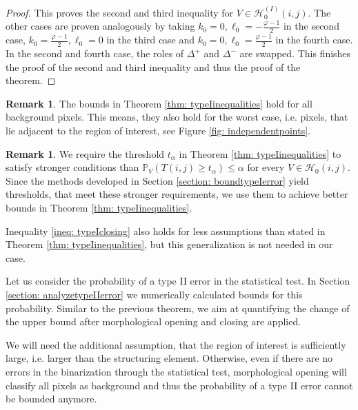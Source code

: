 \documentclass[a4paper,12pt]{article}
\theoremstyle{plain}
\theoremstyle{definition}
\newtheorem{remark}[theorem]{Remark}
\numberwithin{equation}{section}
\begin{document}
\begin{proof}
	This proves the second and third inequality for $V \in \mathcal{H}_0^{(I)}(i, j)$. The other cases are proven analogously by taking $k_0 = 0, \ell_0 = -\frac{\varphi - 1}{2}$ in the second case, $k_0 = \frac{\varphi - 1}{2}, \ell_0 = 0$ in the third case and $k_0 = 0, \ell_0 = \frac{\varphi - 1}{2}$ in the fourth case. In the second and fourth case, the roles of $\Delta^+$ and $\Delta^-$ are swapped. This finishes the proof of the second and third inequality and thus the proof of the theorem.
\end{proof}

\begin{remark}
	The bounds in Theorem \ref{thm: typeIinequalities} hold for all background pixels. This means, they also hold for the worst case, i.e. pixels, that lie adjacent to the region of interest, see Figure \ref{fig: independentpoints}.
\end{remark}

\begin{remark}
	We require the threshold $t_\alpha$ in Theorem \ref{thm: typeIinequalities} to satisfy stronger conditions than $\mathbb{P}_V( T(i, j) \geq t_\alpha ) \leq \alpha$ for every $V \in \mathcal{H}_0(i, j)$. Since the methods developed in Section \ref{section: boundtypeIerror} yield thresholds, that meet these stronger requirements, we use them to achieve better bounds in Theorem \ref{thm: typeIinequalities}.
	
	Inequality \eqref{ineq: typeIclosing} also holds for less assumptions than stated in Theorem \ref{thm: typeIinequalities}, but this generalization is not needed in our case.
\end{remark}

Let us consider the probability of a type II error in the statistical test. In Section \ref{section: analyzetypeIIerror} we numerically calculated bounds for this probability. Similar to the previous theorem, we aim at quantifying the change of the upper bound after morphological opening and closing are applied.

We will need the additional assumption, that the region of interest is sufficiently large, i.e. larger than the structuring element. Otherwise, even if there are no errors in the binarization through the statistical test, morphological opening will classify all pixels as background and thus the probability of a type II error cannot be bounded anymore.
\end{document}
